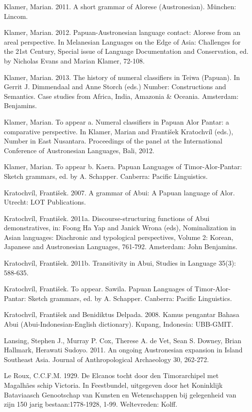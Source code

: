 Klamer, Marian. 2011. A short grammar of Alorese (Austronesian). M\"unchen: Lincom.

Klamer, Marian. 2012. Papuan-Austronesian language contact: Alorese from an areal perspective. In Melanesian Languages on the Edge of Asia: Challenges for the 21st Century, Special issue of Language Documentation and Conservation, ed. by Nicholas Evans and Marian Klamer, 72-108. 

Klamer, Marian. 2013. The history of numeral classifiers in Teiwa (Papuan). In Gerrit J. Dimmendaal and Anne Storch (eds.) Number: Constructions and Semantics. Case studies from Africa, India, Amazonia \& Oceania. Amsterdam: Benjamins.

Klamer, Marian. To appear a. Numeral classifiers in Papuan Alor Pantar: a comparative perspective. In Klamer, Marian and Franti\v{s}ek Kratochv\'il (eds.), Number in East Nusantara. Proceedings of the panel at the International Conference of Austronesian Languages, Bali, 2012. 

Klamer, Marian. To appear b. Kaera. Papuan Languages of Timor-Alor-Pantar: Sketch grammars, ed. by A. Schapper. Canberra: Pacific Linguistics.

Kratochv\'il, Franti\v{s}ek. 2007. A grammar of Abui: A Papuan language of Alor. Utrecht: LOT Publications.

Kratochv\'il, Franti\v{s}ek. 2011a. Discourse-structuring functions of Abui demonstratives, in: Foong Ha Yap and Janick Wrona (eds), Nominalization in Asian languages: Diachronic and typological perspectives, Volume 2: Korean, Japanese and Austronesian Languages, 761-792. Amsterdam: John Benjamins.

Kratochv\'il, Franti\v{s}ek. 2011b. Transitivity in Abui, Studies in Language 35(3): 588-635.

Kratochv\'il, Franti\v{s}ek. To appear. Sawila. Papuan Languages of Timor-Alor-Pantar: Sketch grammars, ed. by A. Schapper. Canberra: Pacific Linguistics.

Kratochv\'il, Franti\v{s}ek and Benidiktus Delpada. 2008. Kamus pengantar Bahasa Abui (Abui-Indonesian-English dictionary). Kupang, Indonesia: UBB-GMIT.

Lansing, Stephen J., Murray P. Cox, Therese A. de Vet, Sean S. Downey, Brian Hallmark, Herawati Sudoyo. 2011. An ongoing Austronesian expansion in Island Southeast Asia. Journal of Anthropological Archaeology 30, 262-272.

Le Roux, C.C.F.M. 1929. De Elcanos tocht door den Timorarchipel met Magalh\~aes schip Victoria. In Feestbundel, uitgegeven door het Koninklijk Bataviaasch Genootschap van Kunsten en Wetenschappen bij gelegenheid van zijn 150 jarig bestaan:1778-1928, 1-99. Weltevreden: Kolff.

